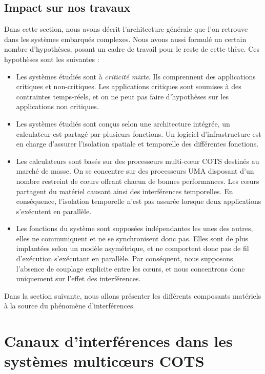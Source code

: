 \subsection{Impact sur nos travaux}

Dans cette section, nous avons décrit l'architecture générale que l'on retrouve dans les systèmes embarqués complexes.
Nous avons aussi formulé un certain nombre d'hypothèses, posant un cadre de travail pour le reste de cette thèse.
Ces hypothèses sont les suivantes :
\begin{itemize}
	\item Les systèmes étudiés sont à \emph{criticité mixte}.
	Ils comprennent des applications critiques et non-critiques.
	Les applications critiques sont soumises à des contraintes temps-réels, et on ne peut pas faire d'hypothèses sur les applications non critiques.

	\item Les systèmes étudiés sont conçus selon une architecture intégrée, un calculateur est partagé par plusieurs fonctions.
	Un logiciel d'infrastructure est en charge d'assurer l'isolation spatiale et temporelle des différentes fonctions.

	\item Les calculateurs sont basés sur des processeurs multi-cœur COTS destinés au marché de masse.
	On se concentre sur des processeurs UMA disposant d'un nombre restreint de cœurs offrant chacun de bonnes performances.
	Les cœurs partagent du matériel causant ainsi des interférences temporelles.
	En conséquence, l'isolation temporelle n'est pas assurée lorsque deux applications s'exécutent en parallèle.

	\item Les fonctions du système sont supposées indépendantes les unes des autres, elles ne communiquent et ne se synchronisent donc pas.
	Elles sont de plus implantées selon un modèle asymétrique, et ne comportent donc pas de fil d'exécution s'exécutant en parallèle.
	Par conséquent, nous supposons l'absence de couplage explicite entre les cœurs, et nous concentrons donc uniquement sur l'effet des interférences.
\end{itemize}

Dans la section suivante, nous allons présenter les différents composants matériels à la source du phénomène d'interférences.

\section{Canaux d'interférences dans les systèmes multicœurs COTS}

